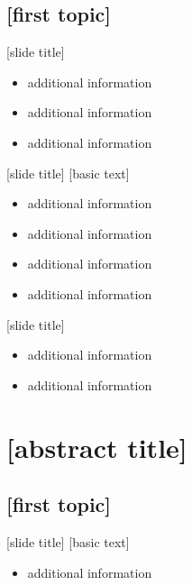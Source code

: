 \documentclass{beamer}
\begin{document}
\subsection{[first topic]}
\begin{frame}{[slide title]}
  \begin{itemize}
    \item<1-> additional information
    \item<2-> additional information
    \item<3-> additional information
  \end{itemize}
\end{frame}
\begin{frame}{[slide title]}
  [basic text]
  \pause
  \begin{itemize}
    \item<2-> additional information
    \item<3-> additional information
    \item<4-> additional information
    \item<5-> additional information
  \end{itemize}
\end{frame}
\begin{frame}{[slide title]}
  \begin{itemize}
    \item<1-> additional information
    \item<2-> additional information
  \end{itemize}
\end{frame}


\section{[abstract title]}
\subsection{[first topic]}
\begin{frame}{[slide title]}
  [basic text]
  \begin{itemize}
    \item<1-> additional information
  \end{itemize}
\end{frame}
\end{document}
